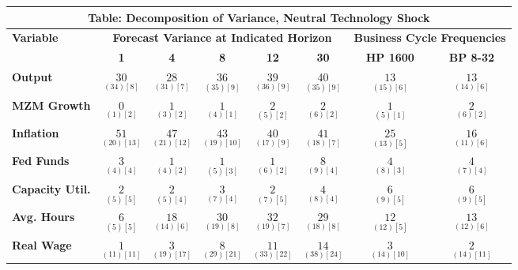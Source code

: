 \documentclass{article}
\begin{document}
 \begin{tabular}{|l|c|@{}c|c|@{}c|c|@{}c|c|} 
 \hline 
 \multicolumn{8}{|c|}{\textbf{Table: Decomposition of Variance, Neutral Technology Shock}} \\ \hline 
 \textbf{Variable} & \multicolumn{5}{|c}{\textbf{Forecast Variance at 
 Indicated Horizon}} & \multicolumn{2}{|c|}{\textbf{Business Cycle 
 Frequencies}} \\ \cline{2-8} 
 & \textbf{1} & \textbf{4} & \textbf{8} & \textbf{12} & \textbf{30} & \textbf{%
 HP 1600} & \textbf{BP 8-32} \\ \hline\hline 
 \textbf{Output} & $\underset{( 34) [  8]}{ 30}$ & $\underset{( 31) [  7]}{ 28}$ & $\underset{( 35) [  9]}{ 36}$ & $\underset{( 36) [  9]}{ 39}$ & $\underset{( 35) [  9]}{ 40}$ & $\underset{( 15) [  6]}{ 13}$ & $\underset{( 14) [  6]}{ 13}$ \\ \hline 
 \textbf{MZM Growth} & $\underset{(  1) [  2]}{  0}$ & $\underset{(  3) [  2]}{  1}$ & $\underset{(  4) [  1]}{  1}$ & $\underset{(  5) [  2]}{  2}$ & $\underset{(  6) [  2]}{  2}$ & $\underset{(  5) [  1]}{  1}$ & $\underset{(  6) [  2]}{  2}$ \\ \hline 
 \textbf{Inflation} & $\underset{( 20) [ 13]}{ 51}$ & $\underset{( 21) [ 12]}{ 47}$ & $\underset{( 19) [ 10]}{ 43}$ & $\underset{( 17) [  9]}{ 40}$ & $\underset{( 18) [  7]}{ 41}$ & $\underset{( 13) [  5]}{ 25}$ & $\underset{( 11) [  6]}{ 16}$ \\ \hline 
 \textbf{Fed Funds} & $\underset{(  4) [  4]}{  3}$ & $\underset{(  4) [  2]}{  1}$ & $\underset{(  5) [  3]}{  1}$ & $\underset{(  6) [  2]}{  1}$ & $\underset{(  9) [  4]}{  8}$ & $\underset{(  8) [  3]}{  4}$ & $\underset{(  7) [  4]}{  4}$ \\ \hline 
 \textbf{Capacity Util.} & $\underset{(  5) [  5]}{  2}$ & $\underset{(  5) [  4]}{  2}$ & $\underset{(  7) [  4]}{  3}$ & $\underset{(  7) [  5]}{  2}$ & $\underset{(  8) [  4]}{  4}$ & $\underset{(  9) [  5]}{  6}$ & $\underset{(  9) [  5]}{  6}$ \\ \hline 
 \textbf{Avg. Hours} & $\underset{(  5) [  5]}{  6}$ & $\underset{( 14) [  6]}{ 18}$ & $\underset{( 19) [  8]}{ 30}$ & $\underset{( 19) [  7]}{ 32}$ & $\underset{( 18) [  8]}{ 29}$ & $\underset{( 12) [  5]}{ 12}$ & $\underset{( 12) [  6]}{ 13}$ \\ \hline 
 \textbf{Real Wage} &  $\underset{( 11) [ 11]}{  1}$ & $\underset{( 19) [ 17]}{  3}$ & $\underset{( 29) [ 21]}{  8}$ & $\underset{( 33) [ 22]}{ 11}$ & $\underset{( 38) [ 24]}{ 14}$ & $\underset{( 14) [ 10]}{  3}$ & $\underset{( 14) [ 11]}{  2}$ \\ \hline 

\end{tabular}
\end{document}
